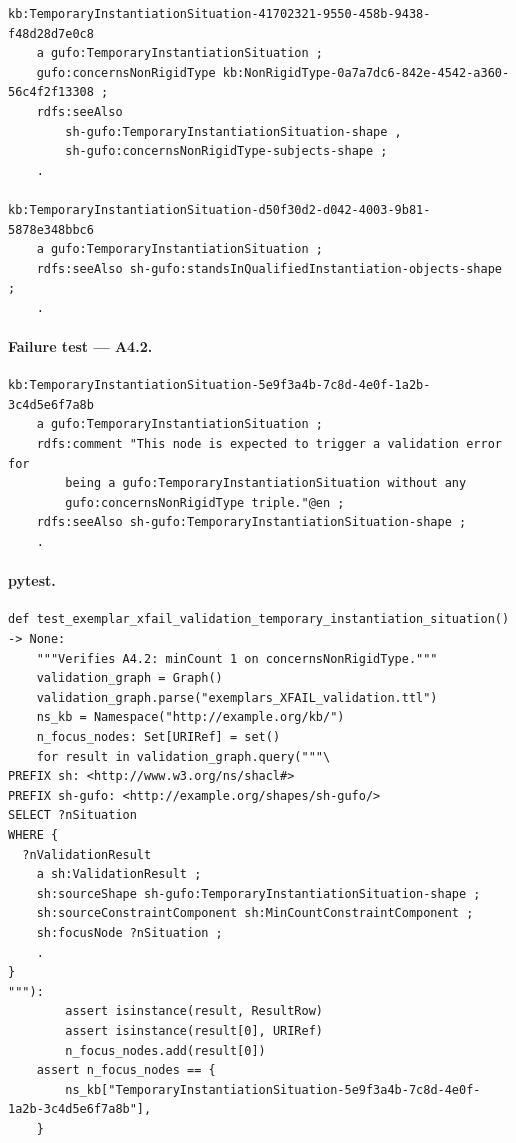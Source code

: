 \documentclass[12pt,a4paper]{article}
\begin{document}
\begin{lstlisting}[style=turtlestyle]
kb:TemporaryInstantiationSituation-41702321-9550-458b-9438-f48d28d7e0c8
    a gufo:TemporaryInstantiationSituation ;
    gufo:concernsNonRigidType kb:NonRigidType-0a7a7dc6-842e-4542-a360-56c4f2f13308 ;
    rdfs:seeAlso
        sh-gufo:TemporaryInstantiationSituation-shape ,
        sh-gufo:concernsNonRigidType-subjects-shape ;
    .

kb:TemporaryInstantiationSituation-d50f30d2-d042-4003-9b81-5878e348bbc6
    a gufo:TemporaryInstantiationSituation ;
    rdfs:seeAlso sh-gufo:standsInQualifiedInstantiation-objects-shape ;
    .
\end{lstlisting}

\paragraph{Failure test --- A4.2.}

\begin{lstlisting}[style=turtlestyle]
kb:TemporaryInstantiationSituation-5e9f3a4b-7c8d-4e0f-1a2b-3c4d5e6f7a8b
    a gufo:TemporaryInstantiationSituation ;
    rdfs:comment "This node is expected to trigger a validation error for
        being a gufo:TemporaryInstantiationSituation without any
        gufo:concernsNonRigidType triple."@en ;
    rdfs:seeAlso sh-gufo:TemporaryInstantiationSituation-shape ;
    .
\end{lstlisting}

\paragraph{pytest.}

\begin{lstlisting}[style=pythonstyle]
def test_exemplar_xfail_validation_temporary_instantiation_situation() -> None:
    """Verifies A4.2: minCount 1 on concernsNonRigidType."""
    validation_graph = Graph()
    validation_graph.parse("exemplars_XFAIL_validation.ttl")
    ns_kb = Namespace("http://example.org/kb/")
    n_focus_nodes: Set[URIRef] = set()
    for result in validation_graph.query("""\
PREFIX sh: <http://www.w3.org/ns/shacl#>
PREFIX sh-gufo: <http://example.org/shapes/sh-gufo/>
SELECT ?nSituation
WHERE {
  ?nValidationResult
    a sh:ValidationResult ;
    sh:sourceShape sh-gufo:TemporaryInstantiationSituation-shape ;
    sh:sourceConstraintComponent sh:MinCountConstraintComponent ;
    sh:focusNode ?nSituation ;
    .
}
"""):
        assert isinstance(result, ResultRow)
        assert isinstance(result[0], URIRef)
        n_focus_nodes.add(result[0])
    assert n_focus_nodes == {
        ns_kb["TemporaryInstantiationSituation-5e9f3a4b-7c8d-4e0f-1a2b-3c4d5e6f7a8b"],
    }
\end{lstlisting}
\end{document}

